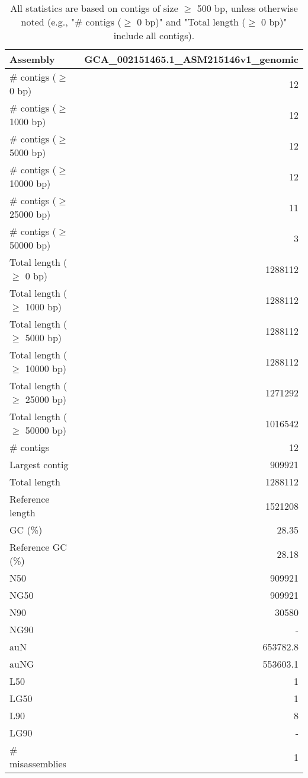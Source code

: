 \documentclass[12pt,a4paper]{article}
\begin{document}
\begin{table}[ht]
\begin{center}
\caption{All statistics are based on contigs of size $\geq$ 500 bp, unless otherwise noted (e.g., "\# contigs ($\geq$ 0 bp)" and "Total length ($\geq$ 0 bp)" include all contigs).}
\begin{tabular}{|l*{1}{|r}|}
\hline
Assembly & GCA\_002151465.1\_ASM215146v1\_genomic \\ \hline
\# contigs ($\geq$ 0 bp) & 12 \\ \hline
\# contigs ($\geq$ 1000 bp) & 12 \\ \hline
\# contigs ($\geq$ 5000 bp) & 12 \\ \hline
\# contigs ($\geq$ 10000 bp) & 12 \\ \hline
\# contigs ($\geq$ 25000 bp) & 11 \\ \hline
\# contigs ($\geq$ 50000 bp) & 3 \\ \hline
Total length ($\geq$ 0 bp) & 1288112 \\ \hline
Total length ($\geq$ 1000 bp) & 1288112 \\ \hline
Total length ($\geq$ 5000 bp) & 1288112 \\ \hline
Total length ($\geq$ 10000 bp) & 1288112 \\ \hline
Total length ($\geq$ 25000 bp) & 1271292 \\ \hline
Total length ($\geq$ 50000 bp) & 1016542 \\ \hline
\# contigs & 12 \\ \hline
Largest contig & 909921 \\ \hline
Total length & 1288112 \\ \hline
Reference length & 1521208 \\ \hline
GC (\%) & 28.35 \\ \hline
Reference GC (\%) & 28.18 \\ \hline
N50 & 909921 \\ \hline
NG50 & 909921 \\ \hline
N90 & 30580 \\ \hline
NG90 & - \\ \hline
auN & 653782.8 \\ \hline
auNG & 553603.1 \\ \hline
L50 & 1 \\ \hline
LG50 & 1 \\ \hline
L90 & 8 \\ \hline
LG90 & - \\ \hline
\# misassemblies & 1 \\ \hline

\end{tabular}
\end{center}
\end{table}
\end{document}
